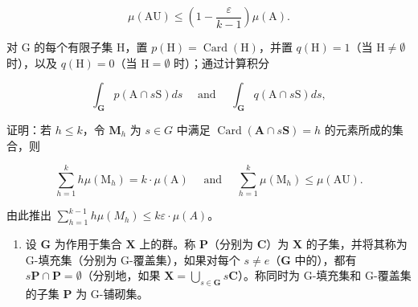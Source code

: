 \[
\mu (\mathrm{AU}) \leqslant \left(1 - \frac {\varepsilon}{k - 1}\right) \mu (\mathrm{A}).
\]

对 G 的每个有限子集 H，置 \(p(\mathrm{H}) = \operatorname{Card}(\mathrm{H})\)，并置 \(q(\mathrm{H}) = 1\)（当 \(\mathrm{H} \neq \emptyset\) 时），以及 \(q(\mathrm{H}) = 0\)（当 \(\mathrm{H} = \emptyset\) 时）；通过计算积分

\[
\int_ {\mathbf {G}} p (\mathrm{A} \cap s \mathrm{S}) d s \quad \text { and } \quad \int_ {\mathbf {G}} q (\mathrm{A} \cap s \mathrm{S}) d s  ,
\]

证明：若 \(h \leqslant k\)，令 \(\mathbf{M}_h\) 为 \(s \in G\) 中满足 \(\operatorname{Card}(\mathbf{A} \cap s\mathbf{S}) = h\) 的元素所成的集合，则

\[
\sum_ {h = 1} ^ {k} h \mu (\mathrm{M} _ {h}) = k \cdot \mu (\mathrm{A}) \quad \text { and } \quad \sum_ {h = 1} ^ {k} \mu (\mathrm{M} _ {h}) \leqslant \mu (\mathrm{AU}).
\]

由此推出 \(\sum_{h=1}^{k-1} h\mu(M_h) \leqslant k\varepsilon \cdot \mu(A)\)。

\begin{enumerate}
\def\labelenumi{\arabic{enumi})}
\setcounter{enumi}{26}
\tightlist
\item
  设 \(\mathbf{G}\) 为作用于集合 \(\mathbf{X}\) 上的群。称 \(\mathbf{P}\)（分别为 \(\mathbf{C}\)）为 \(\mathbf{X}\) 的子集，并将其称为 G-填充集（分别为 G-覆盖集），如果对每个 \(s \neq e\)（\(\mathbf{G}\) 中的），都有 \(s\mathbf{P} \cap \mathbf{P} = \emptyset\)（分别地，如果 \(\mathbf{X} = \bigcup_{s \in \mathbf{G}} s\mathbf{C}\)）。称同时为 G-填充集和 G-覆盖集的子集 \(\mathbf{P}\) 为 G-铺砌集。
\end{enumerate}

